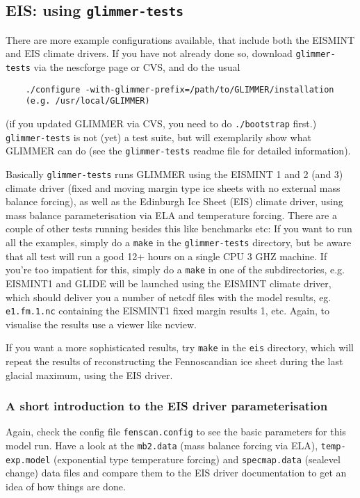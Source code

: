 
\subsection{EIS: using \texttt{glimmer-tests}}
There are more example configurations available, that include both the EISMINT
and EIS climate drivers. If you have not already done so, download
\texttt{glimmer-tests} via the nescforge page or CVS, and do the usual
\begin{verbatim}
    ./configure -with-glimmer-prefix=/path/to/GLIMMER/installation
    (e.g. /usr/local/GLIMMER)
\end{verbatim}
(if you updated GLIMMER via CVS, you need to do \texttt{./bootstrap} first.)\\
\texttt{glimmer-tests} is not (yet) a test suite, but will exemplarily show
what GLIMMER can do (see the \texttt{glimmer-tests} readme file for detailed
information).

Basically \texttt{glimmer-tests} runs GLIMMER using the EISMINT 1 and 2 (and 3)
climate driver (fixed and moving margin type ice sheets with no external mass
balance forcing), as well as the Edinburgh Ice Sheet (EIS) climate driver,
using mass balance parameterisation via ELA and temperature forcing. There are
a couple of other tests running besides this like benchmarks etc: If you want
to run all the examples, simply do a \texttt{make} in the
\texttt{glimmer-tests} directory, but be aware that all test will run a good
12+ hours on a single CPU 3 GHZ machine. If you're too impatient for this,
simply do a \texttt{make} in one of the subdirectories, e.g. EISMINT1 and GLIDE
will be launched using the EISMINT climate driver, which should deliver you a
number of netcdf files with the model results, eg. \texttt{e1.fm.1.nc}
containing the EISMINT1 fixed margin results 1, etc. Again, to visualise the
results use a viewer like ncview.

If you want a more sophisticated results, try \texttt{make} in the \texttt{eis}
directory, which will repeat the results of \cite{Hagdorn2003} reconstructing
the Fennoscandian ice sheet during the last glacial maximum, using the EIS
driver.

\subsubsection{A short introduction to the EIS driver parameterisation}

Again, check the config file \texttt{fenscan.config} to see the basic
parameters for this model run. Have a look at the \texttt{mb2.data} (mass
balance forcing via ELA), \texttt{temp-exp.model} (exponential type temperature
forcing) and \texttt{specmap.data} (sealevel change) data files and compare
them to the EIS driver documentation to get an idea of how things are done.

